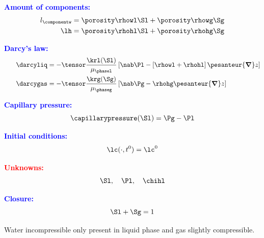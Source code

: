 \documentclass[a0,portrait]{a0poster}
\begin{document}
\begin{multicols}{2}
\begin{tcolorbox}
\begin{minipage}{0.3 \linewidth}
\textcolor{blue}{\textbf{Amount of components:}}
\begin{align*}
l_\componentw &= \porosity \rhowl \Sl + \porosity \rhowg \Sg\\
\lh &= \porosity \rhohl \Sl+\porosity \rhohg \Sg
\end{align*}
\end{minipage}
\hfill
\begin{minipage}{0.3 \linewidth}
\textcolor{blue}{\textbf{Darcy's law:}}
\begin{align*}
\hspace{0.6 cm} \darcyliq &= -\tensor \frac{\displaystyle \krl(\Sl)}{ \displaystyle \mu_{\phasel}} \left[\nab \Pl-\left[\rhowl + \rhohl \right] \pesanteur {\bm\nabla} z\right]\\
  \hspace{0.6 cm} \darcygas &= -\tensor \frac{\displaystyle \krg(\Sg)}{ \displaystyle \mu_{\phaseg}} \left[\nab \Pg - \rhohg \pesanteur {\bm\nabla} z\right]
\end{align*}
\end{minipage}
\hfill
\begin{minipage}{0.2 \linewidth}
\textcolor{blue}{\textbf{Capillary pressure:}}
\begin{equation*}
\capillarypressure(\Sl)=\Pg-\Pl
\end{equation*}
\end{minipage}
\hfill
\begin{minipage}{0.2 \linewidth}
\textcolor{blue}{\textbf{Initial conditions:}}
\begin{equation*}
\lc(\cdot,t^0)=\lc^0
\end{equation*}
\end{minipage}
\hfill
\begin{minipage}{0.3 \linewidth}
\textcolor{red}{\textbf{Unknowns:}}
\begin{equation*}
\Sl, \quad \Pl, \quad \chihl
\end{equation*}
\end{minipage}
\hfill
\begin{minipage}{0.2 \linewidth}
\textcolor{blue}{\textbf{Closure:}}
\begin{equation*}
\Sl + \Sg = 1
\end{equation*}
\end{minipage}
\begin{assumption} 
Water incompressible only present in liquid phase and gas slightly compressible.
\end{assumption}


\end{tcolorbox}
\end{multicols}
\end{document}
